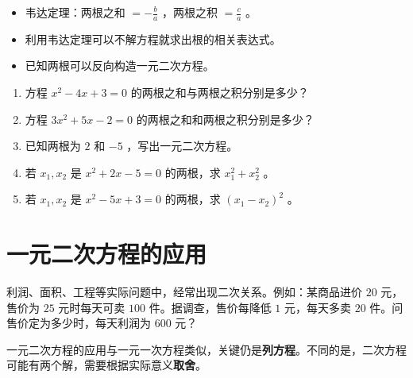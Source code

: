 \begin{keytakeaway}


\begin{itemize}
  \item 韦达定理：两根之和 $= -\frac{b}{a}$ ，两根之积 $= \frac{c}{a}$ 。
  \item 利用韦达定理可以不解方程就求出根的相关表达式。
  \item 已知两根可以反向构造一元二次方程。
\end{itemize}


\end{keytakeaway}

\begin{practice}


\begin{enumerate}
  \item 方程 $x^2 - 4x + 3 = 0$ 的两根之和与两根之积分别是多少？
  \item 方程 $3x^2 + 5x - 2 = 0$ 的两根之和和两根之积分别是多少？
  \item 已知两根为 $2$ 和 $-5$ ，写出一元二次方程。
  \item 若 $x_1, x_2$ 是 $x^2 + 2x - 5 = 0$ 的两根，求 $x_1^2 + x_2^2$ 。
  \item 若 $x_1, x_2$ 是 $x^2 - 5x + 3 = 0$ 的两根，求 $(x_1 - x_2)^2$ 。
\end{enumerate}


\end{practice}

\section*{一元二次方程的应用}


\begin{explore}


利润、面积、工程等实际问题中，经常出现二次关系。例如：某商品进价 $20$ 元，售价为 $25$ 元时每天可卖 $100$ 件。据调查，售价每降低 $1$ 元，每天多卖 $20$ 件。问售价定为多少时，每天利润为 $600$ 元？

\end{explore}

\begin{understand}


一元二次方程的应用与一元一次方程类似，关键仍是\textbf{列方程}。不同的是，二次方程可能有两个解，需要根据实际意义\textbf{取舍}。

\end{understand}

